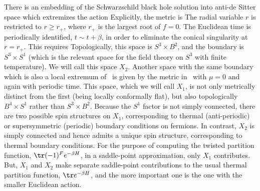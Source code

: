 There is an embedding of the Schwarzschild black hole solution into
anti-de Sitter space which extremizes the action
 Explicitly, the metric is
 The radial variable $r$ is restricted to $r \geq r_+$, where $r_+$ is the
largest root of $f=0$.  The Euclidean time is periodically identified, 
$t \sim t +
\beta$, in order to eliminate the conical singularity at $r = r_+$.  This
requires
 Topologically, this space is $S^3 \times B^2$, and the boundary is $S^3
\times S^1$ (which is the relevant space for the field theory on $S^3$
with finite temperature).  
We will call this space $X_2$.  Another space with the same
boundary which is also a local extremum of \EinAct\ is given by the metric
in \AdSSch\ with $\mu = 0$ and again with periodic time.  This space, which
we will call $X_1$, is not only metrically distinct from the first (being
locally conformally flat), but also topologically $B^4 \times S^1$ rather
than $S^3 \times B^2$.  Because the $S^1$ factor is not simply connected,
there are two possible spin structures on $X_1$, corresponding to thermal
(anti-periodic) or supersymmetric (periodic) boundary conditions on
fermions.  In contrast, $X_2$ is simply connected and hence admits a unique
spin structure, corresponding to thermal boundary conditions.  For the
purpose of computing the twisted partition function, $\tr (-1)^F e^{-\beta
H}$, in a saddle-point approximation, only $X_1$ contributes.  But, $X_1$
and $X_2$ make separate saddle-point contributions to the usual thermal
partition function, $\tr e^{-\beta H}$, and the more important one is the
one with the smaller Euclidean action.

